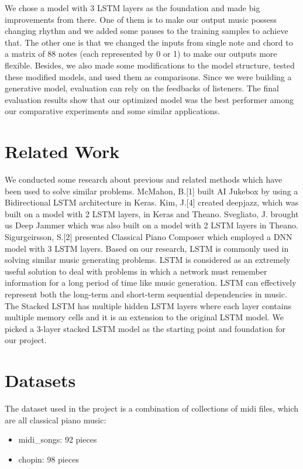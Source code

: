 \documentclass[conference]{IEEEtran}
\begin{document}
We chose a model with 3 LSTM layers as the foundation and made big improvements from there. One of them is to make our output music possess changing rhythm and we added some pauses to the training samples to achieve that. The other one is that we changed the inputs from single note and chord to a matrix of 88 notes (each represented by 0 or 1) to make our outputs more flexible. Besides, we also made some modifications to the model structure, tested these modified models, and used them as comparisons. Since we were building a generative model, evaluation can rely on the feedbacks of listeners. The final evaluation results show that our optimized model was the best performer among our comparative experiments and some similar applications.   


\section{Related Work}

We conducted some research about previous and related methods which have been used to solve similar problems. McMahon, B.[1] built AI Jukebox by using a Bidirectional LSTM architecture in Keras. Kim, J.[4] created deepjazz, which was built on a model with 2 LSTM layers, in Keras and Theano. Svegliato, J. brought us Deep Jammer which was also built on a model with 2 LSTM layers in Theano. Sigurgeirsson, S.[2] presented Classical Piano Composer which employed a DNN model with 3 LSTM layers. Based on our research, LSTM is commonly used in solving similar music generating problems. LSTM is considered as an extremely useful solution to deal with problems in which a network must remember information for a long period of time like music generation. LSTM can effectively represent both the long-term and short-term sequential dependencies in music. The Stacked LSTM has multiple hidden LSTM layers where each layer contains multiple memory cells and it is an extension to the original LSTM model. We picked a 3-layer stacked LSTM model as the starting point and foundation for our project. 

\section{Datasets}
The dataset used in the project is a combination of collections of midi files, which are all classical piano music:
\begin{itemize}
\item midi\_songs: 92 pieces
\item chopin: 98 pieces
\end{itemize}
\end{document}
